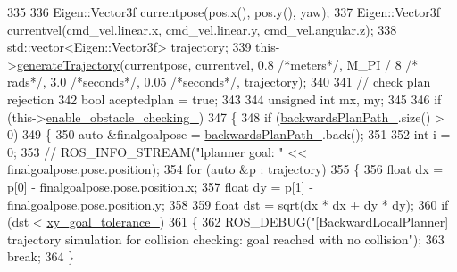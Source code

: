 \begin{DoxyCode}
{335 
336             Eigen::Vector3f currentpose(pos.x(), pos.y(), yaw);
337             Eigen::Vector3f currentvel(cmd\_vel.linear.x, cmd\_vel.linear.y, cmd\_vel.angular.z);
338             std::vector<Eigen::Vector3f> trajectory;
339             this->\hyperlink{classcl__move__base__z_1_1backward__local__planner_1_1BackwardLocalPlanner_a9e8921ca8ce379ca8ba321f82ca23cdc}{generateTrajectory}(currentpose, currentvel, 0.8 \textcolor{comment}{/*meters*/}, M\_PI / 8 \textcolor{comment}{/*
      rads*/}, 3.0 \textcolor{comment}{/*seconds*/}, 0.05 \textcolor{comment}{/*seconds*/}, trajectory);
340 
341             \textcolor{comment}{// check plan rejection}
342             \textcolor{keywordtype}{bool} aceptedplan = \textcolor{keyword}{true};
343 
344             \textcolor{keywordtype}{unsigned} \textcolor{keywordtype}{int} mx, my;
345 
346             \textcolor{keywordflow}{if} (this->\hyperlink{classcl__move__base__z_1_1backward__local__planner_1_1BackwardLocalPlanner_a154043366660cc02ec758dda32817511}{enable\_obstacle\_checking\_})
347             \{
348                 \textcolor{keywordflow}{if} (\hyperlink{classcl__move__base__z_1_1backward__local__planner_1_1BackwardLocalPlanner_ad9cde5c85f782cab2ddb4030e3c3f2cf}{backwardsPlanPath\_}.size() > 0)
349                 \{
350                     \textcolor{keyword}{auto} &finalgoalpose = \hyperlink{classcl__move__base__z_1_1backward__local__planner_1_1BackwardLocalPlanner_ad9cde5c85f782cab2ddb4030e3c3f2cf}{backwardsPlanPath\_}.back();
351 
352                     \textcolor{keywordtype}{int} i = 0;
353                     \textcolor{comment}{// ROS\_INFO\_STREAM("lplanner goal: " << finalgoalpose.pose.position);}
354                     \textcolor{keywordflow}{for} (\textcolor{keyword}{auto} &p : trajectory)
355                     \{
356                         \textcolor{keywordtype}{float} dx = p[0] - finalgoalpose.pose.position.x;
357                         \textcolor{keywordtype}{float} dy = p[1] - finalgoalpose.pose.position.y;
358 
359                         \textcolor{keywordtype}{float} dst = sqrt(dx * dx + dy * dy);
360                         \textcolor{keywordflow}{if} (dst < \hyperlink{classcl__move__base__z_1_1backward__local__planner_1_1BackwardLocalPlanner_aa4ec2c87947a3c08f8278eff052e7c8c}{xy\_goal\_tolerance\_})
361                         \{
362                             ROS\_DEBUG(\textcolor{stringliteral}{"[BackwardLocalPlanner] trajectory simulation for collision checking:
       goal reached with no collision"});
363                             \textcolor{keywordflow}{break};
364                         \}
}
\end{DoxyCode}

